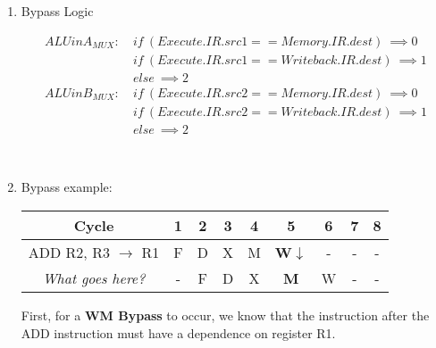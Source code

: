 \documentclass[12pt]{article}
\newenvironment{QandA}{\begin{enumerate}[label=\bfseries\arabic*.]\bfseries}
                      {\end{enumerate}}
\newenvironment{answered}{\par\quad\normalfont}{}
\begin{document}
\begin{QandA}
\begin{answered}
    However, let us look at an \textbf{important contradicting example}:
    \begin{enumerate}
        \item LOAD 8(R2) $\rightarrow$ R3
        \item STORE R4 $\rightarrow$ 4(R3)
    \end{enumerate}
    This will not work, because when the LOAD instruction is in the \textit{Write-back Stage}, and the STORE is in the \textit{Memory Stage}, the STORE instruction would have already calculated the address in the \textit{Execute Stage} and hence cannot recalculate the address with the updated value of R3 here. In this case, WM Bypassing will not work.
    \end{answered}
    
    \ 
    
    \item Bypass Logic
    \begin{answered}
        \begin{equation*}
        \begin{split}
        ALUinA_{MUX} : &\ if\ (Execute.IR.src1 == Memory.IR.dest)\ \implies 0\\ &\ if\ (Execute.IR.src1 == Writeback.IR.dest)\ \implies 1\\ &\ else\ \implies 2
        \end{split}
        \end{equation*}
        \begin{equation*}
        \begin{split}
        ALUinB_{MUX} : &\ if\ (Execute.IR.src2 == Memory.IR.dest)\ \implies 0\\ &\ if\ (Execute.IR.src2 == Writeback.IR.dest)\ \implies 1\\ &\ else\ \implies 2
        \end{split}
        \end{equation*}        
    \end{answered}
    
    \ 
    
    \item Bypass example:
    \begin{answered}
    \begin{center}
    \begin{tabular}{ |c|c|c|c|c|c|c|c|c| } 
     \hline
     Cycle & 1 & 2 & 3 & 4 & 5 & 6 & 7 & 8 \\ 
     \hline
     ADD R2, R3 $\rightarrow$ R1 & F & D & X & M & \textbf{W}$\downarrow$ & - & - & - \\ 
     \textit{What goes here?} & - & F & D & X & \textbf{M } & W & - & - \\ 
     \hline
    \end{tabular}
    \end{center}
    First, for a \textbf{WM Bypass} to occur, we know that the instruction after the ADD instruction must have a dependence on register R1. 
    

\end{answered}
\end{QandA}
\end{document}

